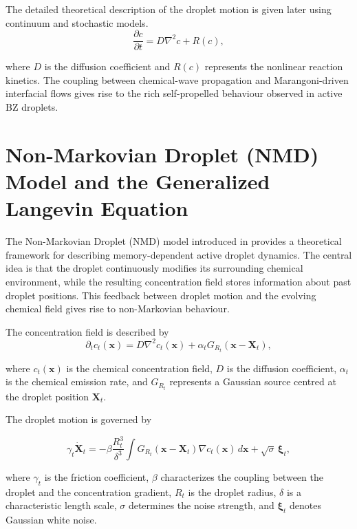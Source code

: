 The detailed theoretical description of the droplet motion is given later using continuum and stochastic models\cite{FastMoving2021article,Shajahan2026}.
\begin{equation}
\frac{\partial c}{\partial t}
=
D\nabla^2 c + R(c),
\end{equation}

where $D$ is the diffusion coefficient and $R(c)$ represents the nonlinear reaction kinetics. The coupling between chemical-wave propagation and Marangoni-driven interfacial flows gives rise to the rich self-propelled behaviour observed in active BZ droplets.
\section{Non-Markovian Droplet (NMD) Model and the Generalized Langevin Equation}
The Non-Markovian Droplet (NMD) model introduced in \cite{droplet2025} provides a theoretical framework for describing memory-dependent active droplet dynamics. The central idea is that the droplet continuously modifies its surrounding chemical environment, while the resulting concentration field stores information about past droplet positions. This feedback between droplet motion and the evolving chemical field gives rise to non-Markovian behaviour.

The concentration field is described by
\begin{equation}
\partial_t c_t(\mathbf{x})
=
D\nabla^2 c_t(\mathbf{x})
+
\alpha_t G_{R_t}(\mathbf{x}-\mathbf{X}_t),
\end{equation}

where $c_t(\mathbf{x})$ is the chemical concentration field, $D$ is the
diffusion coefficient, $\alpha_t$ is the chemical emission rate, and
$G_{R_t}$ represents a Gaussian source centred at the droplet position
$\mathbf{X}_t$.

The droplet motion is governed by

\begin{equation}
\gamma_t \dot{\mathbf X}_t
=
-\beta \frac{R_t^3}{\delta^3}
\int
G_{R_t}(\mathbf{x}-\mathbf X_t)
\nabla c_t(\mathbf{x})
\, d\mathbf{x}
+
\sqrt{\sigma}\,\boldsymbol{\xi}_t ,
\end{equation}

where $\gamma_t$ is the friction coefficient, $\beta$ characterizes the
coupling between the droplet and the concentration gradient, $R_t$ is the
droplet radius, $\delta$ is a characteristic length scale, $\sigma$
determines the noise strength, and $\boldsymbol{\xi}_t$ denotes Gaussian
white noise.

